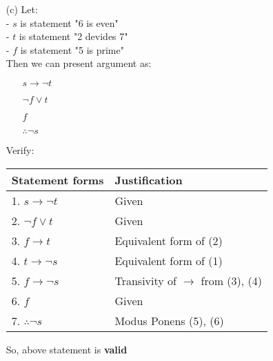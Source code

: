 \begin{enumerate}
    \newpage
    \item[(c)] Let: \\
        - $s$ is statement "6 is even" \\
        - $t$ is statement "2 devides 7" \\
        - $f$ is statement "5 is prime" \\
        Then we can present argument as:
        \begin{enumerate}
            \item[] $s \rightarrow \neg t$
            \item[] $\neg f \lor t$
            \item[] $f$
            \item[] $\therefore \neg s$
        \end{enumerate}
        Verify:
        \begin{table}[hbt!]
            \centering
            \begin{tabular}{|l | l|}
            \hline
            Statement forms & Justification\\ [0.5ex]
            \hline
                1. $s \rightarrow \neg t$ & Given \\
                2. $\neg f \lor t$ & Given \\
                3. $f \rightarrow t$ & Equivalent form of (2) \\
                4. $t \rightarrow \neg s$ & Equivalent form of (1) \\
                5. $f \rightarrow \neg s$ & Transivity of $\rightarrow$ from (3), (4) \\
                6. $f$ & Given \\
                7. $\therefore \neg s$ & Modus Ponens (5), (6) \\
            \hline
            \end{tabular}
        \end{table}
        
        So, above statement is \textbf{valid}


\end{enumerate}
